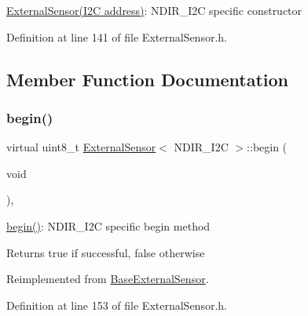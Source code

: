 \hyperlink{class_external_sensor}{External\+Sensor(\+I2\+C address)}\+: N\+D\+I\+R\+\_\+\+I2C specific constructor 

Definition at line 141 of file External\+Sensor.\+h.



\subsection{Member Function Documentation}
\mbox{\label{class_external_sensor_3_01_n_d_i_r___i2_c_01_4_ac6f3614d94968ef0cc11b2b4d69cef03}} 
\subsubsection{\texorpdfstring{begin()}{begin()}}
{\footnotesize\ttfamily virtual uint8\+\_\+t \hyperlink{class_external_sensor}{External\+Sensor}$<$ N\+D\+I\+R\+\_\+\+I2C $>$\+::begin (\begin{DoxyParamCaption}\item[{void}]{ }\end{DoxyParamCaption})\hspace{0.3cm}{\ttfamily [inline]}, {\ttfamily [virtual]}}

\hyperlink{class_external_sensor_3_01_n_d_i_r___i2_c_01_4_ac6f3614d94968ef0cc11b2b4d69cef03}{begin()}\+: N\+D\+I\+R\+\_\+\+I2C specific begin method

\begin{DoxyReturn}{Returns}
true if successful, false otherwise 
\end{DoxyReturn}


Reimplemented from \hyperlink{class_base_external_sensor_a87d132803d4f4fdd4e66332809f0c9a0}{Base\+External\+Sensor}.



Definition at line 153 of file External\+Sensor.\+h.

\mbox{\label{class_external_sensor_3_01_n_d_i_r___i2_c_01_4_add67f5ecaf47d2ee675e8299aee7322d}} 
